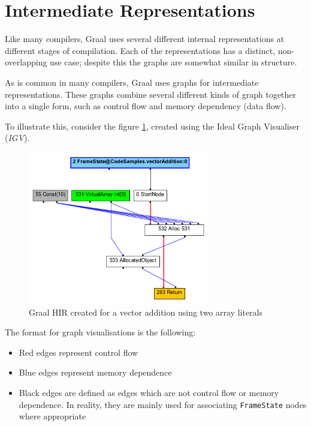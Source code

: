 \section{Intermediate Representations} \label{sec:graal/ir}
Like many compilers, Graal uses several different internal representations at different stages of compilation. Each of the representations has a distinct, non-overlapping use case; despite this the graphs are somewhat similar in structure.

As is common in many compilers, Graal uses graphs for intermediate representations. These graphs combine several different kinds of graph together into a single form, such as control flow and memory dependency (data flow).

To illustrate this, consider the figure \ref{fig:vector-inline}, created using the Ideal Graph Visualiser (\textit{IGV}).

\begin{figure}
	\centering
	\includegraphics[width=0.7\textwidth]{graphics/loop-inline.png}
	\caption{Graal HIR created for a vector addition using two array literals}
	\label{fig:vector-inline}
\end{figure}

The format for graph visualisations is the following:
\begin{itemize}
	\item Red edges represent control flow
	\item Blue edges represent memory dependence
	\item Black edges are defined as edges which are not control flow or memory dependence. In reality, they are mainly used for associating \texttt{FrameState} nodes where appropriate
\end{itemize}


